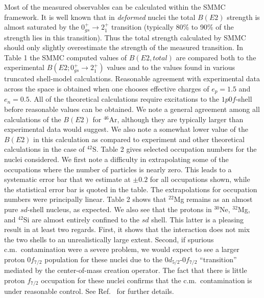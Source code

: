 Most of the measured observables can be calculated within the SMMC
framework.  It is well known that in {\it deformed} nuclei the total
$B(E2)$ strength is almost saturated by the $0^+_{gs} \rightarrow
2_1^+$ transition (typically 80\% to 90\% of the strength lies in this
transition).  
Thus the total strength calculated by SMMC should only
slightly overestimate the strength of the measured transition.  In
Table 1 the SMMC computed values of $B(E2, total)$ are
compared both to the experimental $B(E2; 0^+_{gs} \rightarrow 2^+_1)$
values and to the values found in various truncated shell-model
calculations.  Reasonable agreement with experimental data across the
space is obtained when one chooses effective charges of $e_p=1.5$ and
$e_n=0.5$. 
All of the theoretical
calculations require excitations to the $1p0f$-shell before reasonable
values can be obtained.  We note a general agreement among all
calculations of the $B(E2)$ for $^{46}$Ar, although they are typically
larger than experimental data would suggest. We also note a somewhat
lower value of the $B(E2)$ in this calculation as compared to
experiment and other theoretical calculations in the case of $^{42}$S.
Table 2 gives selected occupation numbers for the nuclei
considered.  We first note a difficulty in extrapolating some of the
occupations where the number of particles is nearly zero.  This leads
to a systematic error bar that we estimate at $\pm 0.2$ for all
occupations shown, while the statistical error bar is quoted in the
table. The extrapolations for occupation numbers were principally
linear. Table 2 shows that $^{22}$Mg remains as an almost
pure $sd$-shell nucleus, as expected.  We also see that the protons in
$^{30}$Ne, $^{32}$Mg, and $^{42}$Si are almost entirely confined to the
$sd$ shell.  This latter is a pleasing result in at least two regards.
First, it shows that the interaction does not mix the two shells to an
unrealistically large extent.  Second, if spurious c.m.\ contamination
were a severe problem, we would expect to see a larger proton
$0f_{7/2}$ population for these nuclei due to the $0d_{5/2}$-$0f_{7/2}$
``transition'' mediated by the center-of-mass creation operator.  The fact that
there is little proton $f_{7/2}$ occupation for these nuclei confirms
that the c.m.\ contamination is under reasonable control.
See Ref.\ \cite{drhklz99} for further details.
